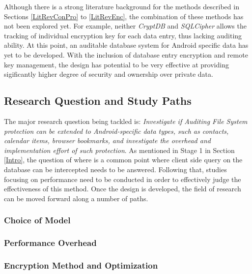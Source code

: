 Although there is a strong literature background for the methods described in Sections \ref{LitRevConPro} to \ref{LitRevEnc}, the combination of these methods has not been explored yet. For example, neither \textit{CryptDB} and \textit{SQLCipher} allows the tracking of individual encryption key for each data entry, thus lacking auditing ability. At this point, an auditable database system for Android specific data has yet to be developed. With the inclusion of database entry encryption and remote key management, the design has potential to be very effective at providing sigificantly higher degree of security and ownership over private data. 

\subsection{Research Question and Study Paths}\label{LitRevQuestion}

The major research question being tackled is: \textit{Investigate if Auditing File System protection can be extended to Android-specific data types, such as contacts, calendar items, browser bookmarks, and investigate the overhead and implementation effort of such protection}. As mentioned in Stage 1 in Section \ref{Intro}, the question of where is a common point where client side query on the database can be intercepted needs to be answered. Following that, studies focusing on performance need to be conducted in order to effectively judge the effectiveness of this method. Once the design is developed, the field of research can be moved forward along a number of paths. 

\subsubsection{Choice of Model}\label{LitRevModel}

\subsubsection{Performance Overhead}\label{LitRevNewRBF}

\subsubsection{Encryption Method and Optimization}\label{LitRevSigma}

